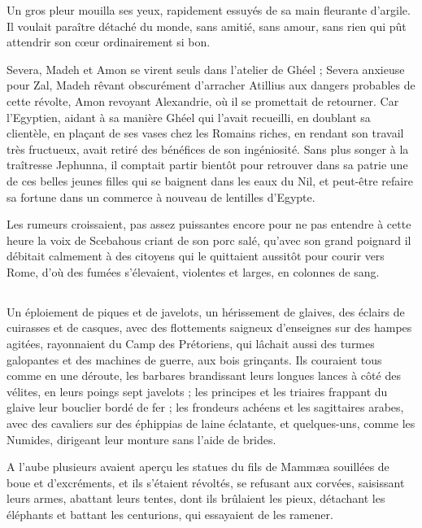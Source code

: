 \documentclass[a4paper, 11pt, oneside, polutonikogreek, french]{article}
\begin{document}
Un gros pleur mouilla ses yeux, rapidement essuyés de sa main fleurante d'argile. Il voulait paraître détaché du monde, sans amitié, sans amour, sans rien qui pût attendrir son cœur ordinairement si bon.

Severa, Madeh et Amon se virent seuls dans l'atelier de Ghéel ; Severa anxieuse pour Zal, Madeh rêvant obscurément d'arracher Atillius aux dangers probables de cette révolte, Amon revoyant Alexandrie, où il se promettait de retourner. Car l'Egyptien, aidant à sa manière Ghéel qui l'avait recueilli, en doublant sa clientèle, en plaçant de ses vases chez les Romains riches, en rendant son travail très fructueux, avait retiré des bénéfices de son ingéniosité. Sans plus songer à la traîtresse Jephunna, il comptait partir bientôt pour retrouver dans sa patrie une de ces belles jeunes filles qui se baignent dans les eaux du Nil, et peut-être refaire sa fortune dans un commerce à nouveau de lentilles d'Egypte.

Les rumeurs croissaient, pas assez puissantes encore pour ne pas entendre à cette heure la voix de Scebahous criant de son porc salé, qu'avec son grand poignard il débitait calmement à des citoyens qui le quittaient aussitôt pour courir vers Rome, d'où des fumées s'élevaient, violentes et larges, en colonnes de sang.
\clearpage
\subsection{}
\paragraph{}
Un éploiement de piques et de javelots, un hérissement de glaives, des éclairs de cuirasses et de casques, avec des flottements saigneux d'enseignes sur des hampes agitées, rayonnaient du Camp des Prétoriens, qui lâchait aussi des turmes galopantes et des machines de guerre, aux bois grinçants. Ils couraient tous comme en une déroute, les barbares brandissant leurs longues lances à côté des vélites, en leurs poings sept javelots ; les principes et les triaires frappant du glaive leur bouclier bordé de fer ; les frondeurs achéens et les sagittaires arabes, avec des cavaliers sur des éphippias de laine éclatante, et quelques-uns, comme les Numides, dirigeant leur monture sans l'aide de brides.

A l'aube plusieurs avaient aperçu les statues du fils de Mammæa souillées de boue et d'excréments, et ils s'étaient révoltés, se refusant aux corvées, saisissant leurs armes, abattant leurs tentes, dont ils brûlaient les pieux, détachant les éléphants et battant les centurions, qui essayaient de les ramener.
\end{document}
